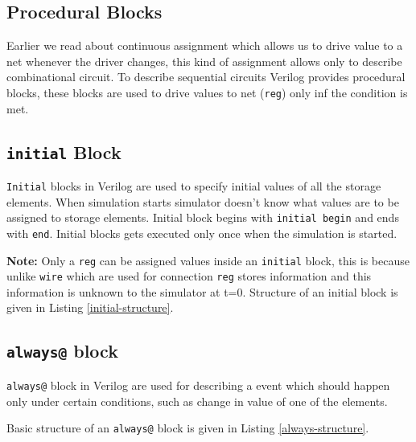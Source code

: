 \documentclass[a4paper,10pt]{article}
\theoremstyle{mytheor}
\newcommand{
  \insertverilog}[3]{
  
}
\begin{document}
\subsection{Procedural Blocks}
Earlier we read about continuous assignment which allows us to drive
value to a net whenever the driver changes, this kind of assignment
allows only to describe combinational circuit. To describe sequential
circuits Verilog provides procedural blocks, these blocks are used to
drive values to net (\lstinline[style=verilog-inline-style]{reg}) only
inf the condition is met.

\subsection{\lstinline[style=verilog-inline-style]{initial} Block}
\lstinline[style=verilog-inline-style]{Initial} blocks in Verilog are
used to specify initial values of all the storage elements. When
simulation starts simulator doesn't know what values are to be
assigned to storage elements. Initial block begins with
\lstinline[style=verilog-inline-style]{initial begin} and ends with
\lstinline[style=verilog-inline-style]{end}. Initial blocks gets
executed only once when the simulation is started.

{\color{red}\textbf{Note:}} Only a
\lstinline[style=verilog-inline-style]{reg} can be assigned values
inside an \lstinline[style=verilog-inline-style]{initial} block, this
is because unlike \lstinline[style=verilog-inline-style]{wire} which
are used for connection \lstinline[style=verilog-inline-style]{reg}
stores information and this information is unknown to the simulator at
t=0. Structure of an initial block is given in Listing \ref{initial-structure}.

\insertverilog{./verilog_files/initialStructure.v}{initial-structure}{Structure of an initial block.} 

\subsection{\lstinline[style=verilog-inline-style]{always@} block}
\lstinline[style=verilog-inline-style]{always@} block in Verilog are
used for describing a event which should happen only under certain
conditions, such as change in value of one of the elements.
 
Basic structure of an \lstinline[style=verilog-inline-style]{always@}
block is given in Listing \ref{always-structure}.

\insertverilog{./verilog_files/alwaysStructure.v}{always-structure}{Structure of an always@ block.} 
\end{document}
